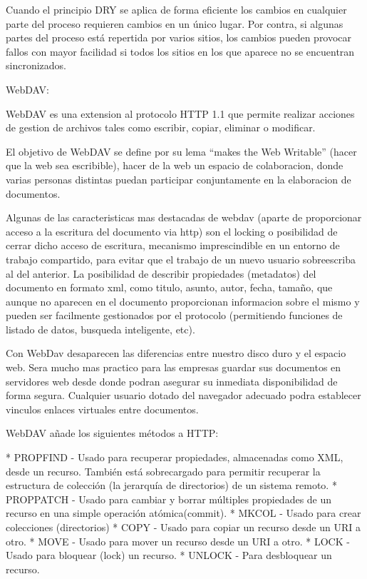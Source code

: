 Cuando el principio DRY se aplica de forma eficiente los cambios en cualquier parte del proceso requieren cambios en un único lugar. Por contra, si algunas partes del proceso está repertida por varios sitios, los cambios pueden provocar fallos con mayor facilidad si todos los sitios en los que aparece no se encuentran sincronizados.


WebDAV:

WebDAV es una extension al protocolo HTTP 1.1 que permite realizar acciones de gestion de archivos tales como escribir, copiar, eliminar o modificar.

El objetivo de WebDAV se define por su lema ``makes the Web Writable'' (hacer que la web sea escribible), hacer de la web un espacio de colaboracion, donde varias personas distintas puedan participar conjuntamente en la elaboracion de documentos.

Algunas de las caracteristicas mas destacadas de webdav (aparte de proporcionar acceso a la escritura del documento via http) son el locking o posibilidad de cerrar dicho acceso de escritura, mecanismo imprescindible en un entorno de trabajo compartido, para evitar que el trabajo de un nuevo usuario sobreescriba al del anterior. La posibilidad de describir propiedades (metadatos) del documento en formato xml, como titulo, asunto, autor, fecha, tamaño, que aunque no aparecen en el documento proporcionan informacion sobre el mismo y pueden ser facilmente gestionados por el protocolo (permitiendo funciones de listado de datos, busqueda inteligente, etc).

Con WebDav desaparecen las diferencias entre nuestro disco duro y el espacio web. Sera mucho mas practico para las empresas guardar sus documentos en servidores web desde donde podran asegurar su inmediata disponibilidad de forma segura. Cualquier usuario dotado del navegador adecuado podra establecer vinculos enlaces virtuales entre documentos.

WebDAV añade los siguientes métodos a HTTP:

    * PROPFIND - Usado para recuperar propiedades, almacenadas como XML, desde un recurso. También está sobrecargado para permitir recuperar la estructura de colección (la jerarquía de directorios) de un sistema remoto.
    * PROPPATCH - Usado para cambiar y borrar múltiples propiedades de un recurso en una simple operación atómica(commit).
    * MKCOL - Usado para crear colecciones (directorios)
    * COPY - Usado para copiar un recurso desde un URI a otro.
    * MOVE - Usado para mover un recurso desde un URI a otro.
    * LOCK - Usado para bloquear (lock) un recurso.
    * UNLOCK - Para desbloquear un recurso.

